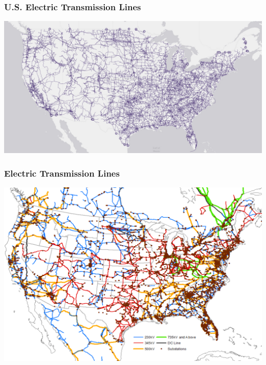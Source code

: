 \documentclass[14pt, unknownkeysallowed]{beamer}
\begin{document}
\begin{frame}
\frametitle{U.S. Electric Transmission Lines}
{\centering%
\includegraphics[width=\linewidth]{UStransmission} %
}
\end{frame}
\begin{frame}
\frametitle{Electric Transmission Lines}
{\centering
\includegraphics[height=.9\textheight]{xgridPlusSubs} %

}
\end{frame}
\end{document}

